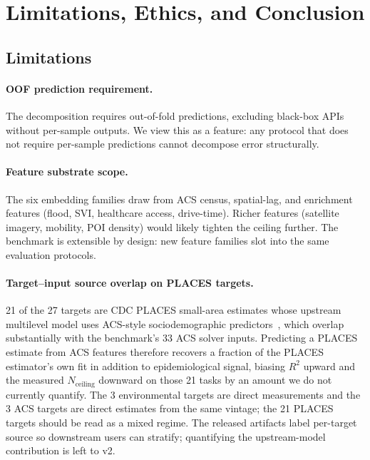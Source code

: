 \documentclass{article}
\begin{document}
\section{Limitations, Ethics, and Conclusion}
\label{sec:conclusion}

\subsection{Limitations}

\paragraph{OOF prediction requirement.} The decomposition requires out-of-fold predictions, excluding black-box APIs without per-sample outputs. We view this as a feature: any protocol that does not require per-sample predictions cannot decompose error structurally.


\paragraph{Feature substrate scope.} The six embedding families draw from ACS census, spatial-lag, and enrichment features (flood, SVI, healthcare access, drive-time). Richer features (satellite imagery, mobility, POI density) would likely tighten the ceiling further. The benchmark is extensible by design: new feature families slot into the same evaluation protocols.

\paragraph{Target--input source overlap on PLACES targets.} 21 of the 27 targets are CDC PLACES small-area estimates whose upstream multilevel model uses ACS-style sociodemographic predictors~\citep{cdcplaces2025methodology}, which overlap substantially with the benchmark's 33 ACS solver inputs. Predicting a PLACES estimate from ACS features therefore recovers a fraction of the PLACES estimator's own fit in addition to epidemiological signal, biasing $R^2$ upward and the measured $N_{\text{ceiling}}$ downward on those 21 tasks by an amount we do not currently quantify. The 3 environmental targets are direct measurements and the 3 ACS targets are direct estimates from the same vintage; the 21 PLACES targets should be read as a mixed regime. The released artifacts label per-target source so downstream users can stratify; quantifying the upstream-model contribution is left to v2.
\end{document}
